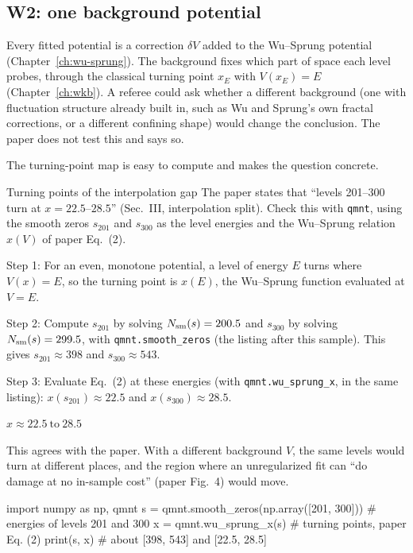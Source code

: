 \subsection{W2: one background potential}

Every fitted potential is a correction $\delta V$ added to the Wu--Sprung potential (Chapter~\ref{ch:wu-sprung}). The background fixes which part of space each level probes, through the classical turning point $x_E$ with $V(x_E)=E$ (Chapter~\ref{ch:wkb}). A referee could ask whether a different background (one with fluctuation structure already built in, such as Wu and Sprung's own fractal corrections, or a different confining shape) would change the conclusion. The paper does not test this and says so.

The turning-point map is easy to compute and makes the question concrete.

\begin{sample}{Turning points of the interpolation gap}
The paper states that ``levels 201--300 turn at $x=22.5$--$28.5$'' (Sec.~III, interpolation split). Check this with \texttt{qmnt}, using the smooth zeros $s_{201}$ and $s_{300}$ as the level energies and the Wu--Sprung relation $x(V)$ of paper Eq.~(2).

Step 1: For an even, monotone potential, a level of energy $E$ turns where $V(x)=E$, so the turning point is $x(E)$, the Wu--Sprung function evaluated at $V=E$.

Step 2: Compute $s_{201}$ by solving $N_{\mathrm{sm}}(s)=200.5$ and $s_{300}$ by solving $N_{\mathrm{sm}}(s)=299.5$, with \texttt{qmnt.smooth\_zeros} (the listing after this sample). This gives $s_{201}\approx398$ and $s_{300}\approx543$.

Step 3: Evaluate Eq.~(2) at these energies (with \texttt{qmnt.wu\_sprung\_x}, in the same listing): $x(s_{201})\approx22.5$ and $x(s_{300})\approx28.5$.

$\boxed{x\approx22.5\ \text{to}\ 28.5}$

This agrees with the paper. With a different background $V$, the same levels would turn at different places, and the region where an unregularized fit can ``do damage at no in-sample cost'' (paper Fig.~4) would move.
\end{sample}

\begin{pycode}
import numpy as np, qmnt
s = qmnt.smooth_zeros(np.array([201, 300]))   # energies of levels 201 and 300
x = qmnt.wu_sprung_x(s)                       # turning points, paper Eq. (2)
print(s, x)                                   # about [398, 543] and [22.5, 28.5]
\end{pycode}

